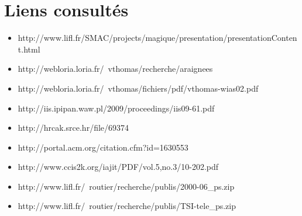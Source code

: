 \section{Liens consultés}

\begin{itemize}
  \item http://www.lifl.fr/SMAC/projects/magique/presentation/presentationContent.html
  \item http://webloria.loria.fr/~vthomas/recherche/araignees
  \item http://webloria.loria.fr/~vthomas/fichiers/pdf/vthomas-wias02.pdf

  \item http://iis.ipipan.waw.pl/2009/proceedings/iis09-61.pdf
  \item http://hrcak.srce.hr/file/69374
  \item http://portal.acm.org/citation.cfm?id=1630553
  \item http://www.ccis2k.org/iajit/PDF/vol.5,no.3/10-202.pdf
  \item http://www.lifl.fr/~routier/recherche/publis/2000-06\_ps.zip
  \item http://www.lifl.fr/~routier/recherche/publis/TSI-tele\_ps.zip
\end{itemize}



